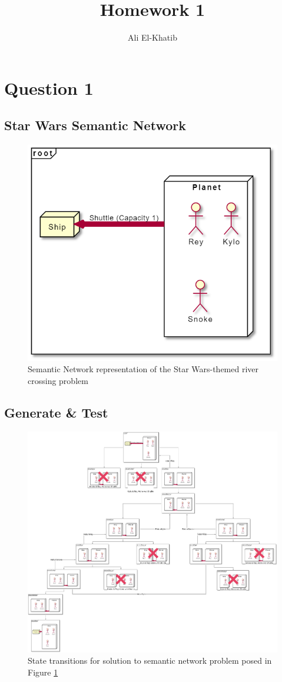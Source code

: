 \documentclass[
	letterpaper, %
]{jdf}
\author{Ali El-Khatib}
\title{Homework 1}
\begin{document}
\maketitle
\section{Question 1}
\subsection{Star Wars Semantic Network}
\begin{figure}[H]
	\centering
	\includegraphics[width=0.7\linewidth]{../figures/starwars-semantic-network}
	\caption{Semantic Network representation of the Star Wars-themed river crossing problem}
	\label{fig:starwars-semantic-network}
\end{figure}
\pagebreak
\subsection{Generate \& Test}
\begin{figure}[hbtp]
	\centering
	\includegraphics{../figures/semantic-network-Page-1.drawio}
	\caption{State transitions for solution to semantic network problem posed in  Figure \ref{fig:starwars-semantic-network}}
	\label{fig:semantic-network-page-1}
\end{figure}
\pagebreak
\end{document}
